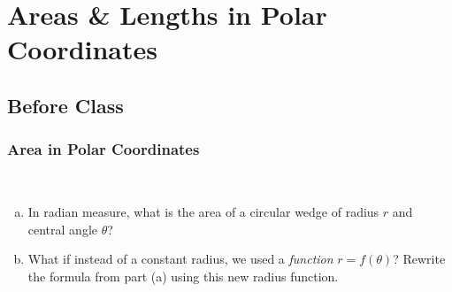 \documentclass[notes]{subfiles}
\begin{document}
	\fancyhead[LO,RE]{\bfseries \small \currentname}
	\fancyfoot[C]{{}}
	\fancyfoot[RO,LE]{\large \thepage}	%
	
\section*{Areas \& Lengths in Polar Coordinates}\label{cs104}
	\subsection*{Before Class}
	\subsubsection*{Area in Polar Coordinates}
		\begin{question}$ $
			\begin{enumerate}[(a)]
				\item In radian measure, what is the area of a circular wedge of radius $r$ and central angle $\theta$?
				\item What if instead of a constant radius, we used a \emph{function} $r = f(\theta)$?  Rewrite the formula from part (a) using this new radius function.
				\end{enumerate}
		\end{question}
		
\end{document}
